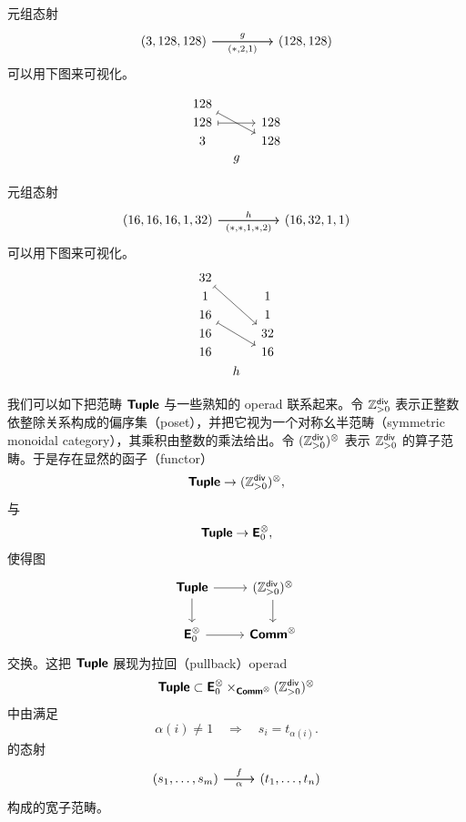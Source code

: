 \begin{example}
\label{morphismginC}
元组态射
\[\begin{tikzcd}
(3,128,128) \ar[rr,"g"] \ar[rr,swap,"(*{,}2{,}1)"] & &  (128,128)
\end{tikzcd} \]
可以用下图来可视化。

\[
    \begin{tikzcd}[row sep = 1, column sep = 8]
     128 \ar[rrdd, mapsto] & &  \\
     128 \ar[rr,mapsto] & & 128 \\
     3 & & 128 \\
     & g & \\
    \end{tikzcd}
    \]
\end{example}
\begin{example}\label{morphismhinC}
    元组态射
    \[ \begin{tikzcd}
    (16,16,16,1,32) \ar[rr,"h"] \ar[rr,swap,"(*{,}*{,}1{,}*{,}2)"] & &  (16,32,1,1)
    \end{tikzcd} \]
    可以用下图来可视化。
    \[
    \begin{tikzcd} [row sep = 1, column sep = 8]
    32 \ar[dddrr,mapsto] & & \\
    1 & & 1 \\
    16 \ar[ddrr,mapsto] & & 1 \\
    16 & & 32 \\
    16 & & 16 \\
    & h & \\
    \end{tikzcd}
    \]
\end{example}

\begin{observation}
    我们可以如下把范畴 ${\boldsymbol{\mathsf{Tuple}}}$ 与一些熟知的 operad 联系起来。令 $\mathbb{Z}_{>0}^{\mathsf{div}}$ 表示正整数依整除关系构成的偏序集（poset），并把它视为一个对称幺半范畴（symmetric monoidal category），其乘积由整数的乘法给出。令 $(\mathbb{Z}_{>0}^{\mathsf{div}})^\otimes$ 表示 $\mathbb{Z}_{>0}^{\mathsf{div}}$ 的算子范畴。于是存在显然的函子（functor）\[{\boldsymbol{\mathsf{Tuple}}} \to (\mathbb{Z}_{>0}^{\mathsf{div}})^\otimes,\]与\[{\boldsymbol{\mathsf{Tuple}}} \to {\boldsymbol{\mathsf{E}}}_0^\otimes,\]使得图
    \[ \begin{tikzcd}
    \catstyle{Tuple} \ar[r] \ar[d] & (\mathbb{Z}_{>0}^{\mathterm{div}})^\otimes \ar[d] \\
    \catstyle{E}_0^\otimes \ar[r] & \catstyle{Comm}^\otimes
    \end{tikzcd} \]
    交换。这把 ${\boldsymbol{\mathsf{Tuple}}}$ 展现为拉回（pullback）operad
    \[
    {\boldsymbol{\mathsf{Tuple}}} \subset {\boldsymbol{\mathsf{E}}}_0^\otimes \times_{{\boldsymbol{\mathsf{Comm}}}^\otimes}(\mathbb{Z}_{>0}^{\mathsf{div}})^\otimes\]
    中由满足
    \[
    \alpha(i) \neq 1 \quad \Rightarrow \quad  s_i = t_{\alpha(i)}.
    \]
    的态射
    \[\begin{tikzcd} (s_1,\dots,s_m) \ar[r,"f"] \ar[r,swap,"\alpha"] & (t_1,\dots,t_n)
    \end{tikzcd}\]
    构成的宽子范畴。
\end{observation}

